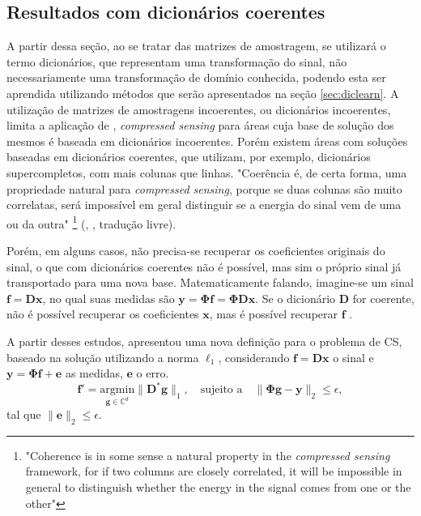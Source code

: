 \documentclass[cic,tc]{iiufrgs}
\renewcommand{\vec}[1]{\bm{#1}}
\begin{document}
\subsection{Resultados com dicionários coerentes}
A partir dessa seção, ao se tratar das matrizes de amostragem, se utilizará 
o termo dicionários, que representam uma transformação do sinal, 
não necessariamente uma transformação de domínio conhecida,
podendo esta ser aprendida utilizando métodos que serão apresentados na seção \ref{sec:diclearn}.
A utilização de matrizes de amostragens incoerentes, ou dicionários incoerentes, 
limita a aplicação de ,
\emph{compressed sensing} para áreas cuja base de solução dos mesmos é baseada
em dicionários incoerentes.
Porém existem áreas com soluções baseadas em dicionários coerentes, que utilizam, 
por exemplo, dicionários supercompletos, com mais colunas que linhas. 
"Coerência é, de certa forma, uma propriedade natural para \emph{compressed sensing}, 
porque se duas colunas são muito correlatas, será impossível em geral distinguir se a energia do sinal
vem de uma ou da outra" 
\footnote{"Coherence is in some sense a natural property in the \emph{compressed sensing} framework, for if two
columns are closely correlated, it will be impossible in general to distinguish whether the energy in 
the signal comes from one or the other"}
(\citeauthor{CANDESDICTS}, \citeyear{CANDESDICTS}, tradução livre).

Porém, em alguns casos, não precisa-se recuperar os coeficientes originais do sinal, o que com dicionários 
coerentes não é possível, mas sim o próprio sinal já transportado para uma nova base.
Matematicamente falando, imagine-se um sinal $\vec{f} = \mathbf{D}\vec{x}$, no qual suas medidas são
$\vec{y} = \mathbf{\Phi}\vec{f} = \mathbf{\Phi}\mathbf{D}\vec{x}$. 
Se o dicionário $\mathbf{D}$ for
coerente, não é possível recuperar os coeficientes $\vec{x}$, mas é possível recuperar $\vec{f}$ \cite{CANDESDICTS}.

A partir desses estudos, \citet{CANDESDICTS} apresentou uma nova definição para o problema de CS, 
baseado na solução utilizando a norma $\ell_1$, considerando $\vec{f} = \mathbf{D}\vec{x}$ o sinal
e $\vec{y} = \mathbf{\Phi}\vec{f} + \vec{e}$ as medidas, $\vec{e}$ o erro.
\begin{equation}
    \label{eq:problemDl1}
    \vec{f'} = \underset{\vec{g} \in \mathbb{C}^d}{\text{argmin}} \lVert \mathbf{D}^*\vec{g} \rVert_1, 
    \hspace{1em} \text{sujeito a} \hspace{1em}
    \lVert \mathbf{\Phi} \vec{g} - \vec{y} \rVert_2 \le \epsilon, 
\end{equation}
tal que $\lVert \vec{e} \rVert_2 \le \epsilon $.
\end{document}

